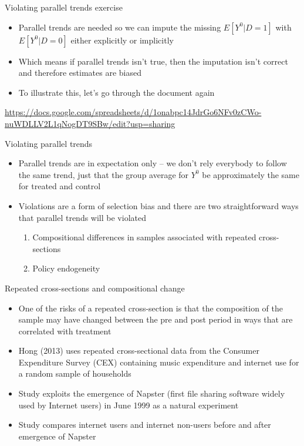 \documentclass{beamer}
\begin{document}
\begin{frame}{Violating parallel trends exercise}

\begin{itemize}
\item Parallel trends are needed so we can impute the missing $E[Y^0|D=1]$ with $E[Y^0|D=0]$ either explicitly or implicitly
\item Which means if parallel trends isn't true, then the imputation isn't correct and therefore estimates are biased
\item To illustrate this, let's go through the document again
\end{itemize}

\url{https://docs.google.com/spreadsheets/d/1onabpc14JdrGo6NFv0zCWo-nuWDLLV2L1qNogDT9SBw/edit?usp=sharing}

\end{frame}


\begin{frame}{Violating parallel trends}

\begin{itemize}
\item Parallel trends are in expectation only -- we don't rely everybody to follow the same trend, just that the group average for $Y^0$ be approximately the same for treated and control 
\item Violations are a form of selection bias and there are two straightforward ways that parallel trends will be violated
	\begin{enumerate}
	\item Compositional differences in samples associated with repeated cross-sections
	\item Policy endogeneity
	\end{enumerate}
\end{itemize}

\end{frame}



\begin{frame}{Repeated cross-sections and compositional change}
	
	\begin{itemize}
	\item One of the risks of a repeated cross-section is that the composition of the sample may have changed between the pre and post period in ways that are correlated with treatment
	\item Hong (2013) uses repeated cross-sectional data from the Consumer Expenditure Survey (CEX) containing music expenditure and internet use for a random sample of households
	\item Study exploits the emergence of Napster (first file sharing software widely used by Internet users) in June 1999 as a natural experiment
	\item Study compares internet users and internet non-users before and after emergence of Napster
	\end{itemize}

\end{frame}
\end{document}
